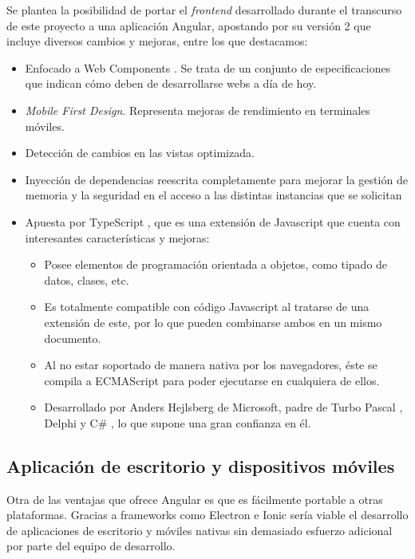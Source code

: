 Se plantea la posibilidad de portar el \textit{frontend} desarrollado durante el transcurso de este proyecto a una aplicación Angular, apostando por su versión 2 que incluye diversos cambios y mejoras, entre los que destacamos:

\begin{itemize}
	\item Enfocado a Web Components \cite{WC}. Se trata de un conjunto de especificaciones que indican cómo deben de desarrollarse webs a día de hoy.
	\item \textit{Mobile First Design}. Representa mejoras de rendimiento en terminales móviles.
	\item Detección de cambios en las vistas optimizada.
	\item Inyección de dependencias reescrita completamente para mejorar la gestión de memoria y la seguridad en el acceso a las distintas instancias que se solicitan
	\item Apuesta por TypeScript \cite{Typescript}, que es una extensión de Javascript que cuenta con interesantes características y mejoras:
	\begin{itemize}
		\item Posee elementos de programación orientada a objetos, como tipado de datos, clases, etc.
		\item Es totalmente compatible con código Javascript al tratarse de una extensión de este, por lo que pueden combinarse ambos en un mismo documento.
		\item Al no estar soportado de manera nativa por los navegadores, éste se compila a ECMAScript \cite{ECMAS} para poder ejecutarse en cualquiera de ellos.
		\item Desarrollado por Anders Hejlsberg \cite{AH} de Microsoft, padre de Turbo Pascal \cite{TurboP}, Delphi \cite{Delphi} y C\# \cite{CSharp}, lo que supone una gran confianza en él.
	\end{itemize}
\end{itemize}

\subsection{Aplicación de escritorio y dispositivos móviles}

Otra de las ventajas que ofrece Angular es que es fácilmente portable a otras plataformas. Gracias a frameworks como Electron \cite{Electron} e Ionic \cite{Ionic} sería viable el desarrollo de aplicaciones de escritorio y móviles nativas sin demasiado esfuerzo adicional por parte del equipo de desarrollo.
